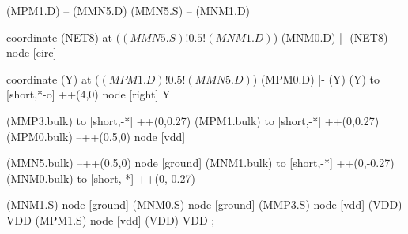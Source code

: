 \begin{circuitikz}[american]
	(MPM1.D) -- (MMN5.D)
	(MMN5.S) -- (MNM1.D)
	
	coordinate (NET8) at ($(MMN5.S)!0.5!(MNM1.D)$)
	(MNM0.D) |- (NET8) node [circ] {}
	
	coordinate (Y) at ($(MPM1.D)!0.5!(MMN5.D)$)
	(MPM0.D) |- (Y)
	(Y) to [short,*-o] ++(4,0) node [right] {Y}
	
	(MMP3.bulk) to [short,-*] ++(0,0.27)
	(MPM1.bulk) to [short,-*] ++(0,0.27)	
	(MPM0.bulk) --++(0.5,0) node [vdd]{}
	
	(MMN5.bulk) --++(0.5,0) node [ground]{}
	(MNM1.bulk) to [short,-*] ++(0,-0.27) 
	(MNM0.bulk) to [short,-*] ++(0,-0.27)


	(MNM1.S) node [ground] {}
	(MNM0.S) node [ground] {}
	(MMP3.S) node [vdd] (VDD) {VDD}
	(MPM1.S) node [vdd] (VDD) {VDD}
;

\end{circuitikz}
